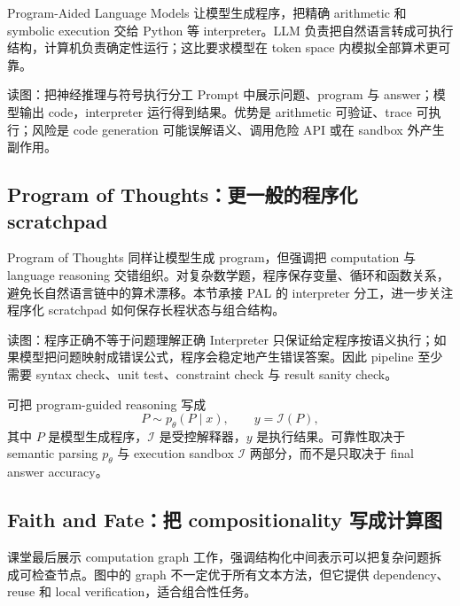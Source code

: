 Program-Aided Language Models 让模型生成程序，把精确 arithmetic 和 symbolic execution 交给 Python 等 interpreter。LLM 负责把自然语言转成可执行结构，计算机负责确定性运行；这比要求模型在 token space 内模拟全部算术更可靠。


\begin{knowledgebox}{读图：把神经推理与符号执行分工}
Prompt 中展示问题、program 与 answer；模型输出 code，interpreter 运行得到结果。优势是 arithmetic 可验证、trace 可执行；风险是 code generation 可能误解语义、调用危险 API 或在 sandbox 外产生副作用。
\end{knowledgebox}

\subsection{Program of Thoughts：更一般的程序化 scratchpad}

Program of Thoughts 同样让模型生成 program，但强调把 computation 与 language reasoning 交错组织。对复杂数学题，程序保存变量、循环和函数关系，避免长自然语言链中的算术漂移。本节承接 PAL 的 interpreter 分工，进一步关注程序化 scratchpad 如何保存长程状态与组合结构。


\begin{knowledgebox}{读图：程序正确不等于问题理解正确}
Interpreter 只保证给定程序按语义执行；如果模型把问题映射成错误公式，程序会稳定地产生错误答案。因此 pipeline 至少需要 syntax check、unit test、constraint check 与 result sanity check。
\end{knowledgebox}

可把 program-guided reasoning 写成
\[
P\sim p_\theta(P\mid x),\qquad y=\mathcal{I}(P),
\]
其中 $P$ 是模型生成程序，$\mathcal{I}$ 是受控解释器，$y$ 是执行结果。可靠性取决于 semantic parsing $p_\theta$ 与 execution sandbox $\mathcal{I}$ 两部分，而不是只取决于 final answer accuracy。

\subsection{Faith and Fate：把 compositionality 写成计算图}

课堂最后展示 computation graph 工作，强调结构化中间表示可以把复杂问题拆成可检查节点。图中的 graph 不一定优于所有文本方法，但它提供 dependency、reuse 和 local verification，适合组合性任务。

